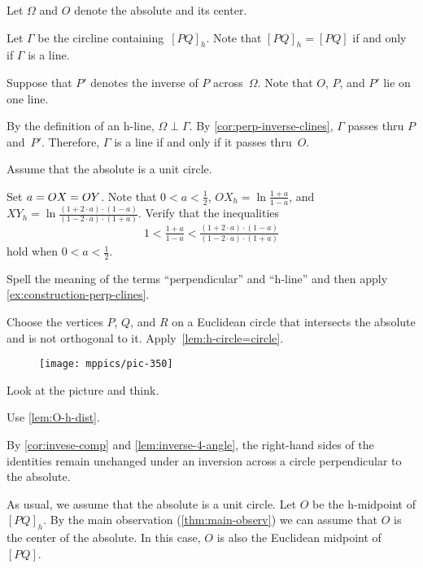 Let $\Omega$ and $O$ denote the absolute and its center. 

Let $\Gamma$ be the circline containing~$[PQ]_h$.
Note that $[PQ]_h=[PQ]$ if and only if $\Gamma$ is a line.

Suppose that $P'$ denotes the inverse of $P$ across~$\Omega$.
Note that $O$, $P$, and $P'$ lie on one line.

By the definition of an h-line, $\Omega\perp \Gamma$.
By \ref{cor:perp-inverse-clines}, $\Gamma$ passes thru $P$ and~$P'$. 
Therefore, $\Gamma$
is a line if and only if it passes thru~$O$.

Assume that the absolute is a unit circle.

Set $a=OX=OY$.
Note that $0<a<\tfrac12$,
$
OX_h=\ln \tfrac{1+a}{1-a}$,
and
$XY_h=\ln \tfrac{(1+2\cdot a)\cdot(1-a)}{(1-2\cdot a)\cdot(1+a)}$.
Verify that the inequalities 
\[1<
\tfrac{1+a}{1-a}
<
\tfrac{(1+2\cdot a)\cdot(1-a)}{(1-2\cdot a)\cdot(1+a)}\]
hold when $0<a<\tfrac12$.

Spell the meaning of the terms ``perpendicular'' and ``h-line'' and then apply \ref{ex:construction-perp-clines}.

Choose the vertices $P$, $Q$, and $R$ on a Euclidean circle that intersects the absolute and is not orthogonal to it.
Apply~\ref{lem:h-circle=circle}.

\begin{wrapfigure}[9]{r}{34mm}
\vskip-0mm
\centering
\texttt{[image: mppics/pic-350]}
\end{wrapfigure}

 Look at the picture and think.

 Use \ref{lem:O-h-dist}.

By \ref{cor:invese-comp} and \ref{lem:inverse-4-angle},
the right-hand sides of the identities 
remain unchanged under an inversion across a circle perpendicular to the absolute.

As usual, we assume that the absolute is a unit circle.
Let $O$ be the h-midpoint of $[PQ]_h$.
By the main observation (\ref{thm:main-observ})
we can assume that $O$ is the center of the absolute.
In this case, $O$ is also the Euclidean midpoint of $[PQ]$.%

